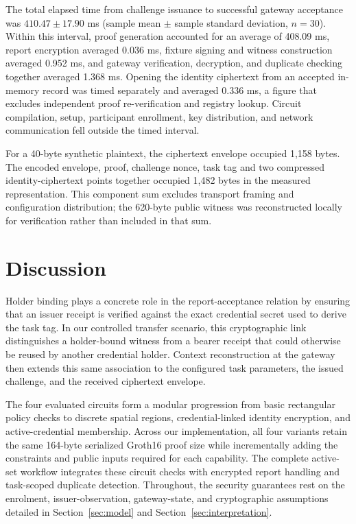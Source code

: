\documentclass[pdflatex,iicol,sn-mathphys-num]{sn-jnl}
\begin{document}
The total elapsed time from challenge issuance to successful gateway acceptance was $410.47\pm17.90$ ms (sample mean $\pm$ sample standard deviation, $n=30$). Within this interval, proof generation accounted for an average of 408.09 ms, report encryption averaged 0.036 ms, fixture signing and witness construction averaged 0.952 ms, and gateway verification, decryption, and duplicate checking together averaged 1.368 ms. Opening the identity ciphertext from an accepted in-memory record was timed separately and averaged 0.336 ms, a figure that excludes independent proof re-verification and registry lookup. Circuit compilation, setup, participant enrollment, key distribution, and network communication fell outside the timed interval.

For a 40-byte synthetic plaintext, the ciphertext envelope occupied 1,158 bytes. The encoded envelope, proof, challenge nonce, task tag and two compressed identity-ciphertext points together occupied 1,482 bytes in the measured representation. This component sum excludes transport framing and configuration distribution; the 620-byte public witness was reconstructed locally for verification rather than included in that sum.

\section{Discussion}
\label{sec:discussion}
Holder binding plays a concrete role in the report-acceptance relation by ensuring that an issuer receipt is verified against the exact credential secret used to derive the task tag. In our controlled transfer scenario, this cryptographic link distinguishes a holder-bound witness from a bearer receipt that could otherwise be reused by another credential holder. Context reconstruction at the gateway then extends this same association to the configured task parameters, the issued challenge, and the received ciphertext envelope.

The four evaluated circuits form a modular progression from basic rectangular policy checks to discrete spatial regions, credential-linked identity encryption, and active-credential membership. Across our implementation, all four variants retain the same 164-byte serialized Groth16 proof size while incrementally adding the constraints and public inputs required for each capability. The complete active-set workflow integrates these circuit checks with encrypted report handling and task-scoped duplicate detection. Throughout, the security guarantees rest on the enrolment, issuer-observation, gateway-state, and cryptographic assumptions detailed in Section~\ref{sec:model} and Section~\ref{sec:interpretation}.
\end{document}
